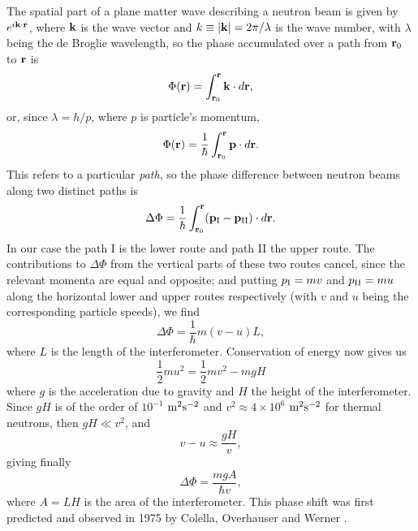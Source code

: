 \documentclass[twocolumn,reprint,amsmath,amssymb]{revtex4}
\begin{document}
The spatial part of a plane matter wave describing a neutron beam is given by 
$e^{i\bold{k \cdot {r}}}$, where $\bold{k}$ is the wave vector and $k \equiv |\bold{k}| = 2\pi/\lambda$ is the wave number, 
with $\lambda$ being the de Broglie wavelength, so the phase accumulated over a path from ${\bf r}_0$ to ${\bf r}$ is
\begin{equation}
\label{eq:1}
\Phi({\bf r}) = \int_{{\bf r}_0}^{\bf r} \bold{k}\cdot d{\bf r},
\end{equation}
or, since $\lambda = h/p$, where $p$ is particle's momentum, 
\begin{equation}
\label{eq:2}
\Phi({\bf r}) = \frac{1}{\hbar}\int_{{\bf r}_0}^{\bf r} \bold{p}\cdot d{\bf r}.
\end{equation}
This refers to a particular \emph{path}, so the phase difference between neutron beams along two distinct paths is 
\begin{equation}
\Delta\Phi = \frac{1}{\hbar}\int_{{\bf r}_0}^{\bf r} (\bold{p}_{\rm I} - \bold{p}_{\rm II})
\cdot d{\bf r}.
\end{equation}
In our case the path I is the lower route and path II the upper route. The contributions to $\Delta\Phi$ from the vertical parts of these two routes cancel, since the relevant momenta are equal and opposite; and putting $p_{\rm I} = mv$ and $p_{\rm II} = mu$ along the horizontal lower and upper routes respectively (with $v$ and $u$ being the corresponding particle speeds), we find 
\begin{equation}
\Delta\Phi = \frac{1}{\hbar}m(v-u)L,
\end{equation}
where $L$ is the length of the interferometer. 
Conservation of energy now gives us
\begin{equation}
\label{eq:3}
\frac{1}{2} mu^2 = \frac{1}{2} mv^2 - mgH
\end{equation}
where $g$ is the acceleration due to gravity and $H$ the height of the interferometer. Since $gH$ is of the order of $10^{-1}$ ${\rm m}^2{\rm s}^{-2} $ 
and $v^2 \approx 4 \times 10^6$ ${\rm m}^2 {\rm s}^{-2}$ for thermal neutrons, then $gH \ll v^2$, and
\begin{equation}
v-u \approx \frac{gH}{v},
\end{equation}
giving finally
\begin{equation}
\label{eq:5}
\Delta\Phi = \frac{mgA}{\hbar v},
\end{equation}
where $A = LH$ is the area of the interferometer. This phase shift was first predicted and observed in 1975 by Colella, Overhauser and Werner \cite{1}.
\end{document}
